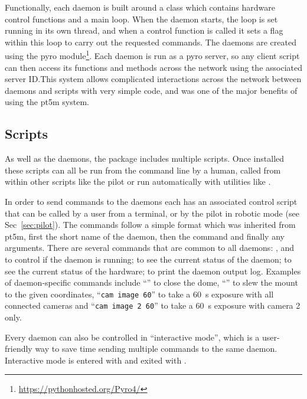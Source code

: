 \begin{colsection}
\begin{colsection}
Functionally, each daemon is built around a  class which contains hardware control functions and a main loop. When the daemon starts, the loop is set running in its own thread, and when a control function is called it sets a flag within this loop to carry out the requested commands. The daemons are created using the \gls{pyro} module\footnote{\url{https://pythonhosted.org/Pyro4/}}. Each daemon is run as a \gls{pyro} server, so any client script can then access its functions and methods across the network using the associated server ID.\@ This system allows complicated interactions across the network between daemons and scripts with very simple code, and was one of the major benefits of using the \gls{pt5m} system.

\end{colsection}


\subsection{Scripts}
\label{sec:scripts}
\begin{colsection}

As well as the daemons, the  package includes multiple  scripts. Once installed these scripts can all be run from the command line by a human, called from within other scripts like the pilot or run automatically with utilities like .

In order to send commands to the daemons each has an associated control script that can be called by a user from a terminal, or by the pilot in robotic mode (see Sec~\ref{sec:pilot}). The commands follow a simple format which was inherited from \gls{pt5m}, first the short name of the daemon, then the command and finally any arguments. There are several commands that are common to all daemons: ,  and  to control if the daemon is running;  to see the current status of the daemon;  to see the current status of the hardware;  to print the daemon output log. Examples of daemon-specific commands include ``'' to close the dome, ``'' to slew the mount to the given coordinates, ``\texttt{cam~image~60}'' to take a \SI{60}{\second} exposure with all connected cameras and ``\texttt{cam~image~2~60}'' to take a \SI{60}{\second} exposure with camera 2 only.

Every daemon can also be controlled in ``interactive mode'', which is a user-friendly way to save time sending multiple commands to the same daemon. Interactive mode is entered with  and exited with .


\end{colsection}
\end{colsection}
